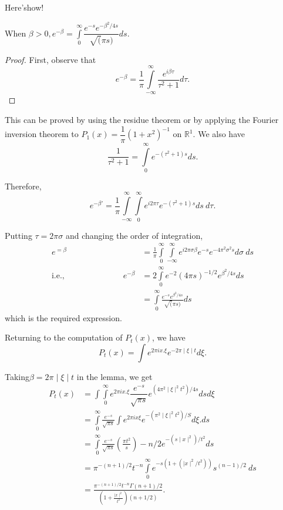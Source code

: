   Here's\pageoriginale how!

\setcounter{lem}{29}
 \begin{lem}\label{chap2:sec4:lem2.30}%
 When $\beta >0, e^{-\beta} =
\int\limits^{\infty}_{0}\dfrac{e^{-s}e^{-\beta^2/4s}}{\surd (\pi s)}ds$. 
 \end{lem}
  
 \begin{proof}
First, observe that 
$$
e^{-\beta} = \frac{1}{\pi}
\int\limits^{\infty}_{-\infty}\frac{e^{i\beta \tau}}{\tau ^2+1}d\tau. 
$$
\end{proof} 
  

This can be proved by using the residue theorem or by applying the
Fourier inversion theorem to $P_1(x)=\dfrac{1}{\pi}(1+x^2)^{-1}$ on
$\mathbb{R}^1$. We also have 
 $$
 \frac{1}{\tau^2+1}=\int\limits^{\infty}_{0} e^{-(\tau^2+1)s}ds.
 $$  
 
Therefore, 
$$
e^{-\beta'} = \frac{1}{\pi} \int\limits^{\infty}_{-\infty}
\int\limits^{\infty}_{0} e^{i2 \pi \tau} e^{-(\tau^2+1)s} ds ~ d\tau. 
$$ 

Putting $\tau = 2\pi \sigma $ and changing the order of integration,
\begin{align*}
  e^{=\beta} &= \frac{1}{\pi} \int\limits_{0}^{\infty}
  \int\limits^{\infty}_{-\infty} e^{i2\pi \sigma \beta} e^{-s} e^{-4\pi
    ^2 \sigma^2 s} d\sigma ~ ds\\ 
  \text{i.e.,} \hspace{3cm} e^{-\beta}&= 2 \int\limits^{\infty}_{0} e^{-2} (4\pi
  s )^{-1/2} e^{\beta^2/ 4s} ds\\ 
  &= \int\limits^{\infty}_{0}\frac{e^{-s}e^{\beta^2/4s}}{ \surd (\pi s)} ds 
\end{align*} 
which is the required expression.

Returning to the computation of $P_t(x)$, we have
$$
P_t(x)= \int e^{2\pi i x. \xi } e^{-2\pi \mid \xi \mid t} d \xi.
$$ 

Taking\pageoriginale $\beta = 2\pi \mid \xi \mid t$ in the lemma, we get
\begin{align*}
  P_t(x)&=\int\int\limits^{\infty}_{0} e^{2\pi ix. \xi}
    \dfrac{e^{-s}}{\sqrt{\pi s}} e^{(4 \pi^2 \mid \xi \mid^2 t^2)/4s} ds
  d\xi \\  
  &= \int\limits^{\infty}_{0} \frac{e^{-s}}{\sqrt{\pi s}} \int e^{2\pi
    ix \xi} e^{-(\pi ^2\mid \xi \mid ^2 t^2)/S} d\xi. ds\\  
  &= \int\limits^{\infty}_{0}\frac{e^{-s}}{\sqrt{\pi s}} \left(\frac{\pi t
    ^2}{s}\right)-n/2 e^{-(s \mid x \mid ^2)/t^2} ds\\ 
  &= \pi^{-(n+1)/2} t^{-n} \int\limits^{\infty}_{0} e^{-s(1+(\mid x \mid
    ^2/t^2))} s^{(n-1)/2} ~ ds \\ 
  &= \frac{\pi^{-(n+1)/2} t^{-n} \Gamma (n+1)/2}{\left(1+\frac{\mid x
      \mid^2}{t^2}\right)(n+1/2)}. 
\end{align*}

